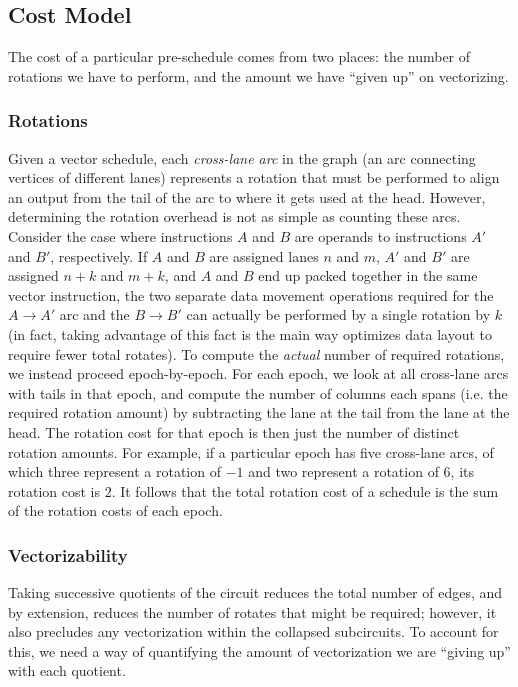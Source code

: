\subsection{Cost Model}\label{sec:cost-model}
The cost of a particular pre-schedule comes from two places: the number of rotations we have to perform, and the amount we have ``given up'' on vectorizing.
\subsubsection*{Rotations}
Given a vector schedule, each {\em cross-lane arc} in the graph (an arc connecting vertices of different lanes) represents a rotation that must be performed to align an output from the tail of the arc to where it gets used at the head.
However, determining the rotation overhead is not as simple as counting these arcs.
Consider the case where instructions $A$ and $B$ are operands to instructions $A'$ and $B'$, respectively.
If $A$ and $B$ are assigned lanes $n$ and $m$, $A'$ and $B'$ are assigned $n+k$ and $m+k$, and $A$ and $B$ end up packed together in the same vector instruction, the two separate data movement operations required for the $A\to A'$ arc and the $B\to B'$ can actually be performed by a single rotation by $k$ (in fact, taking advantage of this fact is the main way \system optimizes data layout to require fewer total rotates). 
To compute the {\em actual} number of required rotations, we instead proceed epoch-by-epoch. 
For each epoch, we look at all cross-lane arcs with tails in that epoch, and compute the number of columns each spans (i.e. the required rotation amount) by subtracting the lane at the tail from the lane at the head.
The rotation cost for that epoch is then just the number of distinct rotation amounts.
For example, if a particular epoch has five cross-lane arcs, of which three represent a rotation of $-1$ and two represent a rotation of $6$, its rotation cost is $2$.
It follows that the total rotation cost of a schedule is the sum of the rotation costs of each epoch.

\subsubsection*{Vectorizability}
Taking successive quotients of the circuit reduces the total number of edges, and by extension, reduces the number of rotates that might be required; however, it also precludes any vectorization within the collapsed subcircuits.
To account for this, we need a way of quantifying the amount of vectorization we are ``giving up'' with each quotient.

